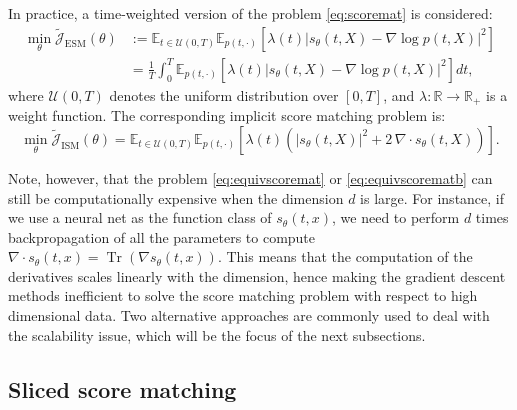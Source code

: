 \documentclass[letterpaper,11pt,reqno]{amsart}
\DeclareMathOperator\tr{Tr}
\numberwithin{equation}{section}
\begin{document}
\quad In practice, a time-weighted version of the problem \eqref{eq:scoremat} is considered:
\begin{equation}
\label{eq:weighted score matching}
\begin{aligned}
\min_\theta \tilde{\mathcal{J}}_{\text{ESM}}(\theta) & := \mathbb{E}_{t \in \mathcal{U}(0, T)}\mathbb{E}_{p(t, \cdot)} \left[\lambda(t)|s_\theta(t,X) - \nabla \log p(t,X)|^2\right] \\
& = \frac{1}{T} \int_0^T \mathbb{E}_{p(t, \cdot)} \left[\lambda(t)|s_\theta(t,X) - \nabla \log p(t,X)|^2\right]dt,
\end{aligned}
\end{equation}
where $\mathcal{U}(0, T)$ denotes the uniform distribution over $[0, T]$,
and $\lambda: \mathbb{R} \rightarrow \mathbb{R}_{+}$ is a weight function.
The corresponding implicit score matching problem is:
\begin{equation}
\label{eq:equivscorematb}
\min_\theta \tilde{\mathcal{J}}_{\text{ISM}}(\theta) = \mathbb{E}_{t \in \mathcal{U}(0, T)}\mathbb{E}_{p(t, \cdot)} 
\left[\lambda(t) ( |s_\theta(t,X)|^2  + 2 \, \nabla \cdot s_\theta (t,X))\right].
\end{equation}

\quad Note, however, that
the problem \eqref{eq:equivscoremat} or \eqref{eq:equivscorematb}
can still be computationally expensive when the dimension $d$ is large. 
For instance, 
if we use a neural net as the function class of $s_{\theta}(t,x)$,
we need to perform $d$ times backpropagation of all the parameters
to compute $\nabla \cdot s_\theta(t,x) = \tr(\nabla  s_\theta(t,x))$.
This means that 
the computation of the derivatives scales linearly with the dimension,
hence making the gradient descent methods 
inefficient to solve the score matching problem
with respect to high dimensional data.
Two alternative approaches are commonly used to deal with the scalability issue,
which will be the focus of the next subsections.

\subsection{Sliced score matching}
\label{sc32}
 
\end{document}

